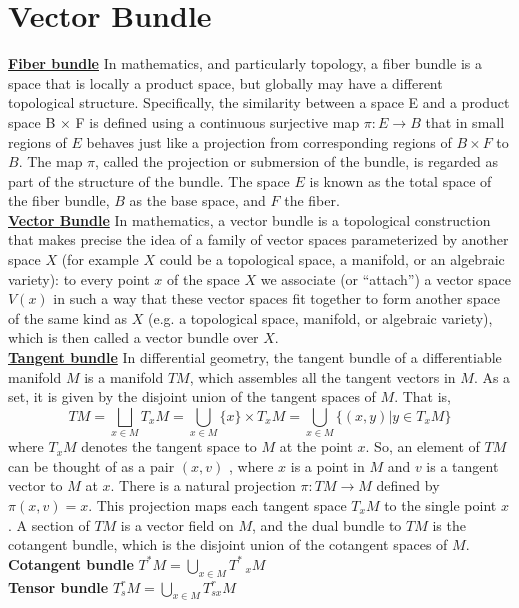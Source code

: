 \section{Vector Bundle}
\begin{newdef}
\href{https://en.wikipedia.org/wiki/Fiber_bundle}{\textbf{Fiber bundle}} In mathematics, and particularly topology, a fiber bundle is a space that is locally a product space, but globally may have a different topological structure. Specifically, the similarity between a space E and a product space B × F is defined using a continuous surjective map $\pi :E \to B$ that in small regions of $E$ behaves just like a projection from corresponding regions of $B \times F$ to $B$. The map $\pi$, called the projection or submersion of the bundle, is regarded as part of the structure of the bundle. The space $E$ is known as the total space of the fiber bundle, $B$ as the base space, and $F$ the fiber.\\
\href{https://en.wikipedia.org/wiki/Vector_bundle}{\textbf{Vector Bundle}} 
In mathematics, a vector bundle is a topological construction that makes precise the idea of a family of vector spaces parameterized by another space $X$ (for example $X$ could be a topological space, a manifold, or an algebraic variety): to every point $x$ of the space $X$ we associate (or ``attach'') a vector space $V(x)$ in such a way that these vector spaces fit together to form another space of the same kind as $X$ (e.g. a topological space, manifold, or algebraic variety), which is then called a vector bundle over $X$.\\
\href{https://en.wikipedia.org/wiki/Tangent_bundle}{\textbf{Tangent bundle}} 
In differential geometry, the tangent bundle of a differentiable manifold $M$ is a manifold $TM$, which assembles all the tangent vectors in $M$. As a set, it is given by the disjoint union of the tangent spaces of $M$. That is,
\[
TM = \bigsqcup_{x \in M}T_xM = \bigcup_{x \in M} \{x\} \times T_xM = \bigcup_{x \in M}\{(x,y)| y \in T_xM \}
\]
where $T_xM$ denotes the tangent space to $M$ at the point $x$. So, an element of $TM$ can be thought of as a pair $(x,v)$ , where $x$ is a point in $M$ and $v$ is a tangent vector to $M$ at $x$. There is a natural projection $\pi : TM \to M$ defined by $\pi(x,v) = x$. This projection maps each tangent space $T_xM$ to the single point $x$. A section of $TM$ is a vector field on $M$, and the dual bundle to $TM$ is the cotangent bundle, which is the disjoint union of the cotangent spaces of $M$.\\
\textbf{Cotangent bundle} $T^*M = \bigcup_{x \in M} T^*_{\phantom{*}x}M$\\
\textbf{Tensor bundle} $T^r_sM = \bigcup_{x \in M} T^{r\phantom{x}}_{sx}M$\\
\end{newdef}


